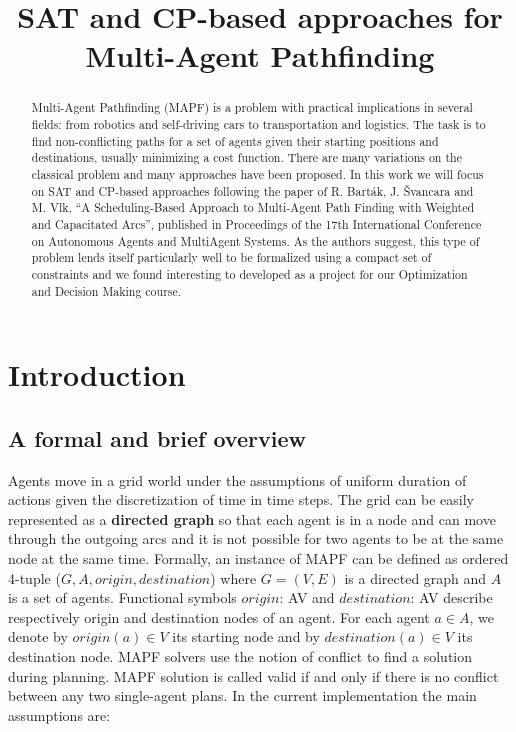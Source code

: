 \documentclass[12pt, a4paper, hidelinks]{article}
\numberwithin{equation}{section}
\begin{document}
\title{SAT and CP-based approaches for Multi-Agent Pathfinding}
\maketitle

\begin{abstract}
Multi-Agent Pathfinding (MAPF) is a problem with practical implications in several fields: from robotics and self-driving cars to transportation and logistics.
The task is to find non-conflicting paths for a set of agents given their starting positions and destinations, usually minimizing a cost function.
There are many variations on the classical problem and many approaches have been proposed.
In this work we will focus on SAT and CP-based approaches following the paper of R. Barták, J. Švancara and M. Vlk, ``A Scheduling-Based Approach to Multi-Agent Path Finding with Weighted and Capacitated Arcs'', published in Proceedings of the 17th International Conference on Autonomous Agents and MultiAgent Systems.
As the authors suggest, this type of problem lends itself particularly well to be formalized using a compact set of constraints and we found interesting to developed as a project for our Optimization and Decision Making course.
\end{abstract}

\section*{Introduction}\label{sec:introduction}
\subsection*{A formal and brief overview}
Agents move in a grid world under the assumptions of uniform duration of actions given the discretization of time in time steps.
The grid can be easily represented as a \textbf{directed graph} so that each agent is in a node and can move through the outgoing arcs and it is not possible for two agents to be at the same node at the same time.
Formally, an instance of MAPF can be defined as ordered 4-tuple ($G, A, origin, destination$) where $G = (V, E)$ is a directed graph and $A$ is a set of agents.
Functional symbols $origin$: A\textrightarrow V and $destination$: A\textrightarrow V describe respectively origin and destination nodes of an agent.
For each agent $a\in A$, we denote by $origin(a)\in V$ its starting node and by $destination(a)\in V$ its destination node.
MAPF solvers use the notion of conflict to find a solution during planning.
MAPF solution is called valid if and only if there is no conflict between any two single-agent plans.
In the current implementation the main assumptions are:
\end{document}
